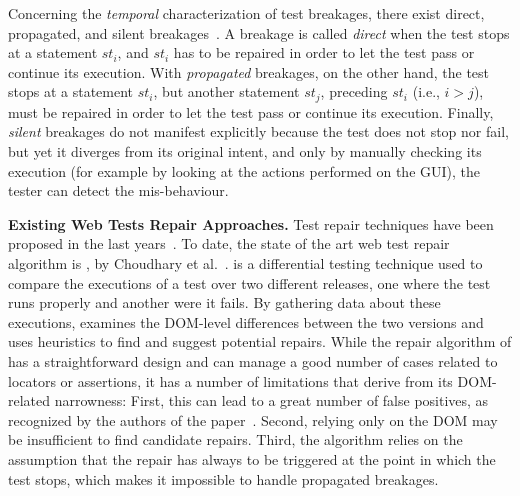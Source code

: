 Concerning the \textit{temporal} characterization of test breakages, there exist direct, propagated, and silent breakages~\cite{Hammoudi-2016-ICST}. A breakage is called \textit{direct} when the test stops at a statement $st_i$, and $st_i$ has to be repaired in order to let the test pass or continue its execution. With \textit{propagated} breakages, on the other hand, the test stops at a statement $st_i$, but another statement $st_j$, preceding $st_i$ (i.e., $i > j$), must be repaired in order to let the test pass or continue its execution. Finally, \textit{silent} breakages do not manifest explicitly because the test does not stop nor fail, but yet it diverges from its original intent, and only by manually checking its execution (for example by looking at the actions performed on the GUI), the tester can detect the mis-behaviour.

\noindent
\textbf{Existing Web Tests Repair Approaches.} Test repair techniques have been proposed in the last years~\cite{Gao:2016:SGT:3046547.3046580,Daniel:2011:AGR:2002931.2002937,Daniel:2009:RSR:1747491.1747538,Daniel:2010:TRU:1831708.1831734,Choudhary:2011:WWA:2002931.2002935,Hammoudi-2016-FSE}. 
To date, the state of the art web test repair algorithm is \water, by Choudhary et al.~\cite{Choudhary:2011:WWA:2002931.2002935}. 
\water is a differential testing technique used to compare the executions of a test over two different releases, one where the test runs properly and another were it fails. By gathering data about these executions, \water examines the DOM-level differences between the two versions and uses heuristics to find and suggest potential repairs.
While the repair algorithm of \water has a straightforward design and can manage a good number of cases related to locators or assertions, it has a number of limitations that derive from its  DOM-related narrowness: First, this can lead to a great number of false positives, as recognized by the authors of the paper~\cite{Choudhary:2011:WWA:2002931.2002935}. Second, 
 relying only on the DOM may be insufficient to find candidate repairs. Third, the algorithm 
 relies on the assumption that the repair has always to be triggered at the point in which the test stops, which makes it impossible to handle propagated breakages. 
 
